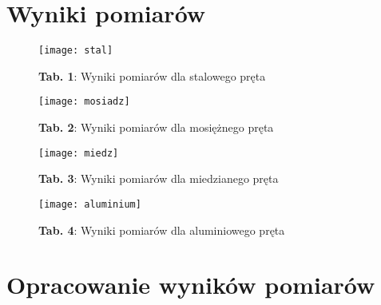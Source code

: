 \documentclass[12pt]{article}
\begin{document}
\section{Wyniki pomiarów}
\begin{figure}[H]
\centering
\texttt{[image: stal]}
\caption*{\textbf{Tab. 1}: Wyniki pomiarów dla stalowego pręta}
\end{figure} 
\begin{figure}[H]
\centering
\texttt{[image: mosiadz]}
\caption*{\textbf{Tab. 2}: Wyniki pomiarów dla mosiężnego pręta}
\end{figure} 
\begin{figure}[H]
\centering
\texttt{[image: miedz]}
\caption*{\textbf{Tab. 3}: Wyniki pomiarów dla miedzianego pręta}
\end{figure} 
\begin{figure}[H]
\centering
\texttt{[image: aluminium]}
\caption*{\textbf{Tab. 4}: Wyniki pomiarów dla aluminiowego pręta}
\end{figure} \newpage
\section{Opracowanie wyników pomiarów}
\end{document}
